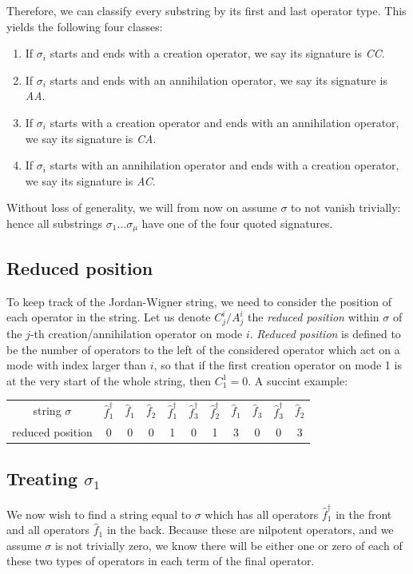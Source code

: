 \documentclass[12pt]{article}
\newcommand{\hc}{^\dagger}
\begin{document}
	Therefore, we can classify every substring by its first and last operator type. This yields the following four classes:
	\begin{enumerate}
	\item If $\sigma_i$ starts and ends with a creation operator, we say its signature is \textit{CC}.
	\item If $\sigma_i$ starts and ends with an annihilation operator, we say its signature is \textit{AA}.
	\item If $\sigma_i$ starts with a creation operator and ends with an annihilation operator, we say its signature is \textit{CA}.
	\item If $\sigma_i$ starts with an annihilation operator and ends with a creation operator, we say its signature is \textit{AC}.
	\end{enumerate}
	
	Without loss of generality, we will from now on assume $\sigma$ to not vanish trivially: hence all substrings $\sigma_1 \dots \sigma_\mu$ have one of the four quoted signatures.
	
	\subsection{Reduced position}
	
	To keep track of the Jordan-Wigner string, we need to consider the position of each operator in the string. Let us denote $C^i_j/A^i_j$ the \textit{reduced position} within $\sigma$ of the $j$-th creation/annihilation operator on mode $i$. \textit{Reduced position} is defined to be the number of operators to the left of the considered operator which act on a mode with index larger than $i$, so that if the first creation operator on mode 1 is at the very start of the whole string, then $C^1_1 = 0$. A succint example:
	\begin{tabular}{c | c c c c c c c c c c}
	string $\sigma$ & $\hat{f}_1\hc$ & $\hat{f}_1$ & $\hat{f}_2$ & $\hat{f}_1\hc$ & $\hat{f}_3\hc$ & $\hat{f}_2\hc$ & $\hat{f}_1$ & $\hat{f}_3$ & $\hat{f}_3\hc$ & $\hat{f}_2$\\
	reduced position & 0 & 0 & 0 & 1 & 0 & 1 & 3 & 0 & 0 & 3
	\end{tabular}
	
	\subsection{Treating $\sigma_1$}
	We now wish to find a string equal to $\sigma$ which has all operators $\hat{f}_1\hc$ in the front and all operators $\hat{f}_1$ in the back. Because these are nilpotent operators, and we assume $\sigma$ is not trivially zero, we know there will be either one or zero of each of these two types of operators in each term of the final operator.
	
\end{document}
